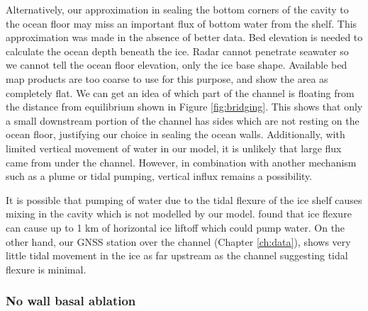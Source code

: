 Alternatively, our approximation in sealing the bottom corners of the cavity to the ocean floor may miss an important flux of bottom water from the shelf. This approximation was made in the absence of better data. Bed elevation is needed to calculate the ocean depth beneath the ice.  Radar cannot penetrate seawater so we cannot tell the ocean floor elevation, only the ice base shape. Available bed map products \citep[e.g.]{fretwell2013bedmap2} are too coarse to use for this purpose, and show the area as completely flat. 
We can get an idea of which part of the channel is floating from the distance from equilibrium shown in Figure \ref{fig:bridging}. This shows that only a small downstream portion of the channel has sides which are not resting on the ocean floor, justifying our choice in sealing the ocean walls. Additionally, with limited vertical movement of water in our model, it is unlikely that large flux came from under the channel. However, in combination with another mechanism such as a plume or tidal pumping, vertical influx remains a possibility.


It is possible that pumping of water due to the tidal flexure of the ice shelf causes mixing in the cavity which is not modelled by our model.  \cite{walker2013ice} found that ice flexure can cause up to 1 km of horizontal ice liftoff which could pump water. On the other hand, our GNSS station over the channel (Chapter \ref{ch:data}), shows very little tidal movement in the ice as far upstream as the channel suggesting tidal flexure is minimal. 



\subsubsection{No wall basal ablation}

